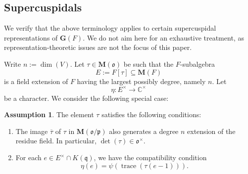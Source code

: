 \documentclass[reqno]{amsart}
\DeclareMathOperator{\trace}{trace}
\theoremstyle{plain} \newtheorem{theorem} {Theorem} \newtheorem{conjecture} {Conjecture} \newtheorem{corollary} [theorem] {Corollary} \newtheorem{proposition} [theorem] {Proposition} \newtheorem{fact} [theorem] {Fact}
\theoremstyle{definition} \newtheorem{definition} [theorem] {Definition}
\theoremstyle{itplain} %
\newtheorem{Assumption}[theorem]{Assumption} \numberwithin{equation}{section} \numberwithin{theorem}{section}
\newcommand{\mfq}{\mathfrak{q}}
\begin{document}
\subsection{Supercuspidals}\label{sec:supercuspidals}
We verify that the above terminology applies to certain supercuspidal representations of $\mathbf{G}(F)$.  We do not aim here for an exhaustive treatment, as representation-theoretic issues are not the focus of this paper.

Write $n := \dim(V)$.  Let $\tau \in \mathbf{M}(\mathfrak{o})$ be such that the $F$-subalgebra
\begin{equation*}
  E := F[\tau] \subseteq \mathbf{M}(F)
\end{equation*}
is a field extension of $F$ having the largest possibly degree, namely $n$.  Let
\begin{equation*}
  \eta : E^\times \rightarrow \mathbb{C}^\times
\end{equation*}
be a character.  We consider the following special case:
\begin{Assumption}\label{Assumption:supercuspidal}
  The element $\tau$ satisfies the following conditions:
  \begin{enumerate}
  \item\label{enumerate:d1bc2d5fbd54} The image $\overline{\tau}$ of $\tau$ in $\mathbf{M}(\mathfrak{o}/\mathfrak{p})$ also generates a degree $n$ extension of the residue field.  In particular, $\det(\tau)\in \mathfrak{o}^\times$.
  \item For each $e \in E^\times \cap K (\mfq)$, we have the compatibility condition
    \begin{equation*}
      \eta(e) = \psi(\trace(\tau (e-1))).
    \end{equation*}
  \end{enumerate}
\end{Assumption}
\end{document}
